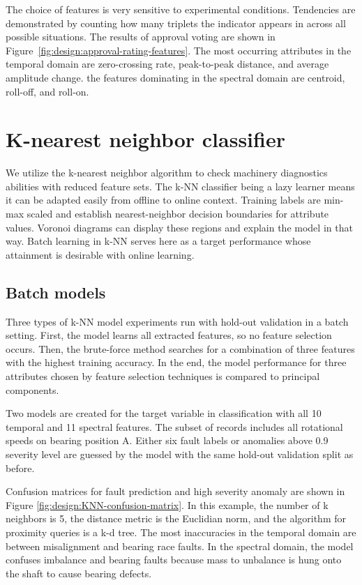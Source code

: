 The choice of features is very sensitive to experimental conditions. Tendencies are demonstrated by counting how many triplets the indicator appears in across all possible situations. The results of approval voting are shown in Figure~\ref{fig:design:approval-rating-features}. The most occurring attributes in the temporal domain are zero-crossing rate, peak-to-peak distance, and average amplitude change. the features dominating in the spectral domain are centroid, roll-off, and roll-on.


\section{K-nearest neighbor classifier}
We utilize the k-nearest neighbor algorithm to check machinery diagnostics abilities with reduced feature sets. The k-NN classifier being a lazy learner means it can be adapted easily from offline to online context. Training labels are min-max scaled and establish nearest-neighbor decision boundaries for attribute values. Voronoi diagrams can display these regions and explain the model in that way. Batch learning in k-NN serves here as a target performance whose attainment is desirable with online learning.

\subsection{Batch models}
Three types of k-NN model experiments run with hold-out validation in a batch setting. First, the model learns all extracted features, so no feature selection occurs. Then, the brute-force method searches for a combination of three features with the highest training accuracy. In the end, the model performance for three attributes chosen by feature selection techniques is compared to principal components.


Two models are created for the target variable in classification with all 10 temporal and 11 spectral features. The subset of records includes all rotational speeds on bearing position A. Either six fault labels or anomalies above 0.9 severity level are guessed by the model with the same hold-out validation split as before. 

Confusion matrices for fault prediction and high severity anomaly are shown in Figure \ref{fig:design:KNN-confusion-matrix}. In this example, the number of k neighbors is 5, the distance metric is the Euclidian norm, and the algorithm for proximity queries is a k-d tree. The most inaccuracies in the temporal domain are between misalignment and bearing race faults. In the spectral domain, the model confuses imbalance and bearing faults because mass to unbalance is hung onto the shaft to cause bearing defects. 

